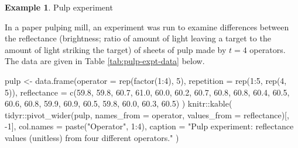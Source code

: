 \documentclass[
]{book}
\newenvironment{Shaded}{\begin{snugshade}}{\end{snugshade}}
\newcommand{\AttributeTok}[1]{\textcolor[rgb]{0.77,0.63,0.00}{#1}}
\newcommand{\DecValTok}[1]{\textcolor[rgb]{0.00,0.00,0.81}{#1}}
\newcommand{\FloatTok}[1]{\textcolor[rgb]{0.00,0.00,0.81}{#1}}
\newcommand{\FunctionTok}[1]{\textcolor[rgb]{0.00,0.00,0.00}{#1}}
\newcommand{\NormalTok}[1]{#1}
\newcommand{\OtherTok}[1]{\textcolor[rgb]{0.56,0.35,0.01}{#1}}
\newcommand{\SpecialCharTok}[1]{\textcolor[rgb]{0.00,0.00,0.00}{#1}}
\newcommand{\StringTok}[1]{\textcolor[rgb]{0.31,0.60,0.02}{#1}}
\theoremstyle{definition}
\theoremstyle{definition}
\newtheorem{example}{Example}[chapter]
\theoremstyle{definition}
\theoremstyle{definition}
\theoremstyle{remark}
\begin{document}
\begin{example}
\protect\hypertarget{exm:one-way}{}\label{exm:one-way}Pulp experiment \citep[ch.~2]{WH2009}

In a paper pulping mill, an experiment was run to examine differences between the reflectance (brightness; ratio of amount of light leaving a target to the amount of light striking the target) of sheets of pulp made by \(t=4\) operators. The data are given in Table \ref{tab:pulp-expt-data} below.

\begin{Shaded}
\begin{Highlighting}[]
\NormalTok{pulp }\OtherTok{\textless{}{-}} \FunctionTok{data.frame}\NormalTok{(}\AttributeTok{operator =} \FunctionTok{rep}\NormalTok{(}\FunctionTok{factor}\NormalTok{(}\DecValTok{1}\SpecialCharTok{:}\DecValTok{4}\NormalTok{), }\DecValTok{5}\NormalTok{),}
                   \AttributeTok{repetition =} \FunctionTok{rep}\NormalTok{(}\DecValTok{1}\SpecialCharTok{:}\DecValTok{5}\NormalTok{, }\FunctionTok{rep}\NormalTok{(}\DecValTok{4}\NormalTok{, }\DecValTok{5}\NormalTok{)), }
                   \AttributeTok{reflectance =} \FunctionTok{c}\NormalTok{(}\FloatTok{59.8}\NormalTok{, }\FloatTok{59.8}\NormalTok{, }\FloatTok{60.7}\NormalTok{, }\FloatTok{61.0}\NormalTok{, }\FloatTok{60.0}\NormalTok{, }\FloatTok{60.2}\NormalTok{, }\FloatTok{60.7}\NormalTok{, }\FloatTok{60.8}\NormalTok{, }
                                    \FloatTok{60.8}\NormalTok{, }\FloatTok{60.4}\NormalTok{, }\FloatTok{60.5}\NormalTok{, }\FloatTok{60.6}\NormalTok{, }\FloatTok{60.8}\NormalTok{, }\FloatTok{59.9}\NormalTok{, }\FloatTok{60.9}\NormalTok{, }\FloatTok{60.5}\NormalTok{, }\FloatTok{59.8}\NormalTok{, }\FloatTok{60.0}\NormalTok{, }\FloatTok{60.3}\NormalTok{, }\FloatTok{60.5}\NormalTok{)}
\NormalTok{                     )}
\NormalTok{knitr}\SpecialCharTok{::}\FunctionTok{kable}\NormalTok{(}
\NormalTok{ tidyr}\SpecialCharTok{::}\FunctionTok{pivot\_wider}\NormalTok{(pulp, }\AttributeTok{names\_from =}\NormalTok{ operator, }\AttributeTok{values\_from =}\NormalTok{ reflectance)[, }\SpecialCharTok{{-}}\DecValTok{1}\NormalTok{],}
 \AttributeTok{col.names =} \FunctionTok{paste}\NormalTok{(}\StringTok{"Operator"}\NormalTok{, }\DecValTok{1}\SpecialCharTok{:}\DecValTok{4}\NormalTok{),}
 \AttributeTok{caption =} \StringTok{"Pulp experiment: reflectance values (unitless) from four different operators."}
\NormalTok{)}
\end{Highlighting}
\end{Shaded}

\begin{table}


\end{table}
\end{example}
\end{document}
